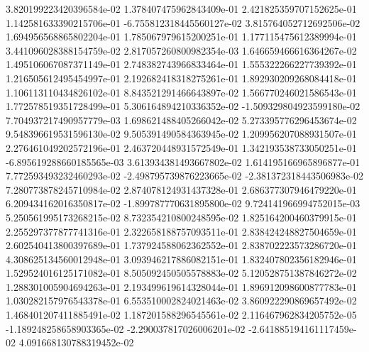 3.820199223420396584e-02	1.378407475962843409e-01	2.421825359707152625e-01	1.142581633390215706e-01	-6.755812318445560127e-02	3.815764052712692506e-02	1.694956568865802204e-01	1.785067979615200251e-01	1.177115475612389994e-01	3.441096028388154759e-02	2.817057260800982354e-03	1.646659466616364267e-02	1.495106067087371149e-01	2.748382743966833464e-01	1.555322266227739392e-01	1.216505612495454997e-01	2.192682418318275261e-01	1.892930209268084418e-01	1.106113110434826102e-01	8.843521291466643897e-02	1.566770246021586543e-01	1.772578519351728499e-01	5.306164894210336352e-02	-1.509329804923599180e-02	7.704937217490957779e-03	1.698621488405266042e-02	5.273395776296453674e-02	9.548396619531596130e-02	9.505391490584363945e-02	1.209956207088931507e-01	2.276461049202572196e-01	2.463720448931572549e-01	1.342193538733050251e-01	-6.895619288660185565e-03	3.613934381493667802e-02	1.614195166965896877e-01	7.772593493232460293e-02	-2.498795739876223665e-02	-2.381372318443506983e-02	7.280773878245710984e-02	2.874078124931437328e-01	2.686377307946479220e-01	6.209434162016350817e-02	-1.899787770631895800e-02	9.724141966994752015e-03	5.250561995173268215e-02	8.732354210800248595e-02	1.825164200460379915e-01	2.255297377877741316e-01	2.322658188757093511e-01	2.838424248827504659e-01	2.602540413800397689e-01	1.737924588062362552e-01	2.838702223573286720e-01	4.308625134560012948e-01	3.093946217886082151e-01	1.832407802356182946e-01	1.529524016125171082e-01	8.505092450505578883e-02	5.120528751387846272e-02	1.288301005904694263e-01	2.193499619614328044e-01	1.896912098600877783e-01	1.030282157976543378e-01	6.553510002824021463e-02	3.860922290869657492e-02	1.468401207411885491e-02	1.187201588296545561e-02	2.116467962834205752e-05	-1.189248258658903365e-02	-2.290037817026006201e-02	-2.641885194161117459e-02	4.091668130788319452e-02
